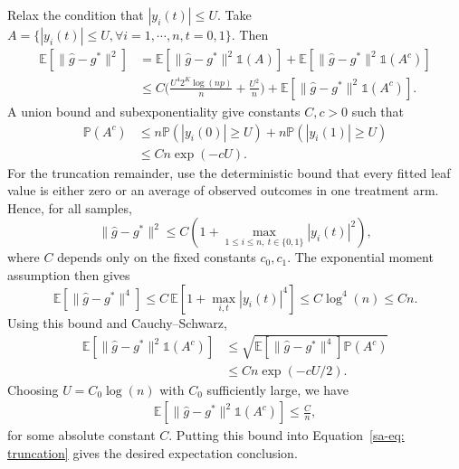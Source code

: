 \documentclass[10pt]{article}
\def\E{\mathbb{E}}
\def\P{\mathbb{P}}
\newcommand{\Indicator}{\mathds{1}}
\theoremstyle{definition}
\theoremstyle{remark}
\begin{document}
Relax the condition that $|y_i(t)| \leq U$. Take $A = \{|y_i(t)| \leq U, \forall i = 1, \cdots, n, t = 0,1\}$. Then
\begin{align}\label{sa-eq: truncation}
    \nonumber \E[ \lVert \hat{g} - g^{\ast}\rVert^2] 
    & = \E[ \lVert \hat{g} - g^{\ast}\rVert^2 \Indicator(A)] + \E[ \lVert \hat{g} - g^{\ast}\rVert^2 \Indicator(A^c)] \\
    & \leq C \bigg(\frac{U^4 2^K \log(np)}{n} + \frac{U^2}{n} \bigg) +  \E[ \lVert \hat{g} - g^{\ast}\rVert^2 \Indicator(A^c)].
\end{align}
A union bound and subexponentiality give constants $C,c>0$ such that
\begin{align*}
    \P(A^c) 
    & \leq n \P(|y_i(0)| \geq U) + n \P(|y_i(1)| \geq U) \\
    & \leq C n \exp(-cU).
\end{align*}
For the truncation remainder, use the deterministic bound that every fitted leaf value is either zero or an average of observed outcomes in one treatment arm. Hence, for all samples,
\[
    \lVert \hat g-g^\ast\rVert^2
    \leq
    C\left(1+\max_{1\leq i\leq n,\ t\in\{0,1\}}|y_i(t)|^2\right),
\]
where $C$ depends only on the fixed constants $c_0,c_1$. The exponential moment assumption then gives
\[
    \E[\lVert \hat g-g^\ast\rVert^4]
    \leq
    C\,\E\left[1+\max_{i,t}|y_i(t)|^4\right]
    \leq C\log^4(n)
    \leq Cn .
\]
Using this bound and Cauchy--Schwarz,
\begin{align*}
    \E[ \lVert \hat{g} - g^{\ast}\rVert^2 \Indicator(A^c)]
    & \leq \sqrt{\E[ \lVert \hat{g} - g^{\ast}\rVert^4]\P(A^c)} \\
    & \leq C n \exp(-cU/2).
\end{align*}
Choosing $U = C_0 \log(n)$ with $C_0$ sufficiently large, we have 
\begin{align*}
    \E[ \lVert \hat{g} - g^{\ast}\rVert^2 \Indicator(A^c)] \leq \frac{C}{n},
\end{align*}
for some absolute constant $C$. Putting this bound into Equation~\eqref{sa-eq: truncation} gives the desired expectation conclusion.
\end{document}
